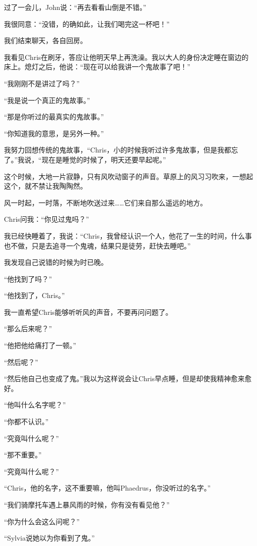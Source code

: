 \documentclass[UTF8]{article}
\begin{document}
\par 过了一会儿，John说：“再去看看山倒是不错。”
\par 我很同意：“没错，的确如此，让我们喝完这一杯吧！”
\par 我们结束聊天，各自回房。
\par 我看见Chris在刷牙，答应让他明天早上再洗澡。我以大人的身份决定睡在窗边的床上。熄灯之后，他说：“现在可以给我讲一个鬼故事了吧！”
\par “我刚刚不是讲过了吗？”
\par “我是说一个真正的鬼故事。”
\par “那是你听过的最真实的鬼故事。”
\par “你知道我的意思，是另外一种。”
\par 我努力回想传统的鬼故事，“Chris，小的时候我听过许多鬼故事，但是我都忘了。”我说，“现在是睡觉的时候了，明天还要早起呢。”
\par 这个时候，大地一片寂静，只有风吹动窗子的声音。草原上的风习习吹来，一想起这个，就不禁让我陶陶然。
\par 风一时起，一时落，不断地吹送过来……它们来自那么遥远的地方。
\par Chris问我：“你见过鬼吗？”
\par 我已经快睡着了，我说：“Chris，我曾经认识一个人，他花了一生的时间，什么事也不做，只是去追寻一个鬼魂，结果只是徒劳，赶快去睡吧。”
\par 我发现自己说错的时候为时已晚。
\par “他找到了吗？”
\par “他找到了，Chris。”
\par 我一直希望Chris能够听听风的声音，不要再问问题了。
\par “那么后来呢？”
\par “他把他给痛打了一顿。”
\par “然后呢？”
\par “然后他自己也变成了鬼。”我以为这样说会让Chris早点睡，但是却使我精神愈来愈好。
\par “他叫什么名字呢？”
\par “你都不认识。”
\par “究竟叫什么呢？”
\par “那不重要。”
\par “究竟叫什么呢？”
\par “Chris，他的名字，这不重要嘛，他叫Phaedrus，你没听过的名字。”
\par “我们骑摩托车遇上暴风雨的时候，你有没有看见他？”
\par “你为什么会这么问呢？”
\par “Sylvia说她以为你看到了鬼。”
\end{document}
